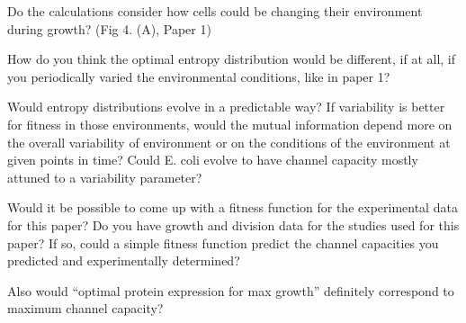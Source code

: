 \begin{tcolorbox}
Do the calculations consider how cells could be changing their environment
during growth? (Fig 4. (A), Paper 1)
\end{tcolorbox}

\begin{tcolorbox}
How do you think the optimal entropy distribution would be different, if at all,
if you periodically varied the environmental conditions, like in paper 1?
\end{tcolorbox}

\begin{tcolorbox}
Would entropy distributions evolve in a predictable way? If variability is
better for fitness in those environments, would the mutual information depend
more on the overall variability of environment or on the conditions of the
environment at given points in time? Could E. coli evolve to have channel
capacity mostly attuned to a variability parameter?
\end{tcolorbox}

\begin{tcolorbox}
Would it be possible to come up with a fitness function for the experimental
data for this paper? Do you have growth and division data for the studies used
for this paper? If so, could a simple fitness function predict the channel
capacities you predicted and experimentally determined?
\end{tcolorbox}

\begin{tcolorbox}
Also would “optimal protein expression for max growth” definitely correspond to
maximum channel capacity? 
\end{tcolorbox}
